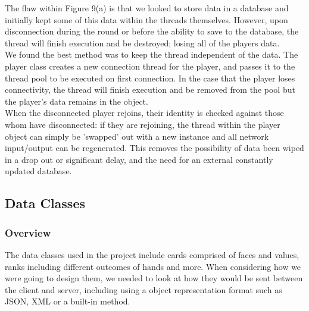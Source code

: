 \documentclass[11pt]{article}
\begin{document}
The flaw within Figure 9(a) is that we looked to store data in a database and initially kept some of this data within the threads themselves. However, upon disconnection during the round or before the ability to save to the database, the thread will finish execution and be destroyed; losing all of the players data. \\

We found the best method was to keep the thread independent of the data. The player class creates a new connection thread for the player, and passes it to the thread pool to be executed on first connection. In the case that the player loses connectivity, the thread will finish execution and be removed from the pool but the player's data remains in the object. \\

When the disconnected player rejoins, their identity is checked against those whom have disconnected: if they are rejoining, the thread within the player object can simply be 'swapped' out with a new instance and all network input/output can be regenerated. This removes the possibility of data been wiped in a drop out or significant delay, and the need for an external constantly updated database.


%	
%	
%	


\newpage

\subsection{Data Classes}


\subsubsection{Overview}
The data classes used in the project include cards comprised of faces and values, ranks including different outcomes of hands and more. When considering how we were going to design them, we needed to look at how they would be sent between the client and server, including using a object representation format such as JSON, XML or a built-in method.
\end{document}
